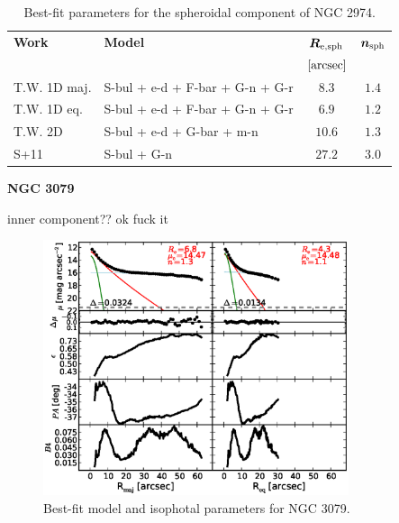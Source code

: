 \documentclass[preprint2]{emulateapj}
\newcommand{\fitfigurewidth}{0.8\textwidth}
\begin{document}
  \begin{table}[h]
  \small
  \caption{Best-fit parameters for the spheroidal component of NGC 2974.}
  \begin{center}
  \begin{tabular}{llcc}
  \hline
  {\bf Work} & {\bf Model}   & $\bm R_{\rm e,sph}$    & $\bm n_{\rm sph}$ \\
    &  &  $[\rm arcsec]$ & \\
  \hline
  T.W. 1D maj. & S-bul + e-d + F-bar + G-n + G-r & $8.3$   &  $1.4$ \\
  T.W. 1D eq.  & S-bul + e-d + F-bar + G-n + G-r & $6.9$   &  $1.2$ \\
  T.W. 2D      & S-bul + e-d + G-bar + m-n	 & $10.6$  &  $1.3$ \\
  \hline
  S+11         & S-bul + G-n & $27.2$  &  $3.0$ \\
  \hline
  \end{tabular}
  \end{center}
  \label{tab:n2974}
  \end{table}

  \clearpage\newpage\noindent
    
  {\bf NGC 3079 \\}

  inner component?? ok fuck it

  \begin{figure}[h]
  \begin{center}
  \includegraphics[width=\fitfigurewidth]{images/n3079_1Dfit.eps}
  \caption{Best-fit model and isophotal parameters for NGC 3079.}
  \end{center}
  \end{figure}
\end{document}
